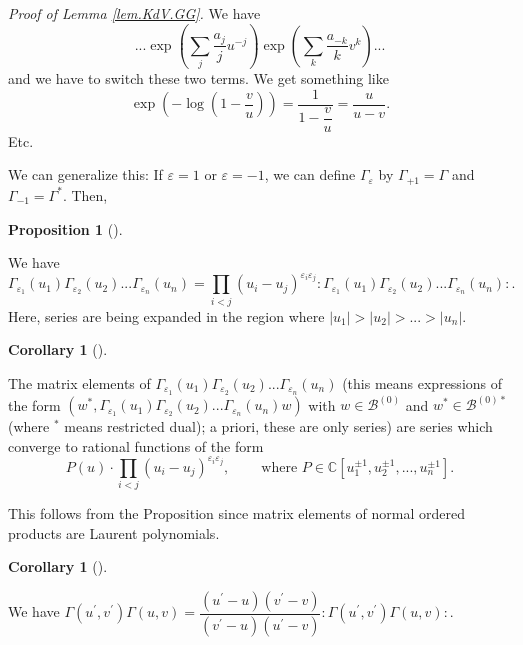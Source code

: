 \documentclass
[numbers=enddot,12pt,final,onecolumn,german,notitlepage]{scrartcl}%
\theoremstyle{definition}
\newtheorem{prop}[theo]{Proposition}
\newenvironment{proposition}[1][]
{\begin{prop}[#1]\begin{leftbar}}
{\end{leftbar}\end{prop}}
\newtheorem{coro}[theo]{Corollary}
\newenvironment{corollary}[1][]
{\begin{coro}[#1]\begin{leftbar}}
{\end{leftbar}\end{coro}}
\begin{document}
\textit{Proof of Lemma \ref{lem.KdV.GG}.} We have%
\[
...\exp\left(  \sum_{j}\dfrac{a_{j}}{j}u^{-j}\right)  \exp\left(  \sum
_{k}\dfrac{a_{-k}}{k}v^{k}\right)  ...
\]
and we have to switch these two terms. We get something like%
\[
\exp\left(  -\log\left(  1-\dfrac{v}{u}\right)  \right)  =\dfrac{1}%
{1-\dfrac{v}{u}}=\dfrac{u}{u-v}.
\]
Etc.

We can generalize this: If $\varepsilon=1$ or $\varepsilon=-1$, we can define
$\Gamma_{\varepsilon}$ by $\Gamma_{+1}=\Gamma$ and $\Gamma_{-1}=\Gamma^{\ast}%
$. Then,

\begin{proposition}
We have%
\[
\Gamma_{\varepsilon_{1}}\left(  u_{1}\right)  \Gamma_{\varepsilon_{2}}\left(
u_{2}\right)  ...\Gamma_{\varepsilon_{n}}\left(  u_{n}\right)  =\prod
\limits_{i<j}\left(  u_{i}-u_{j}\right)  ^{\varepsilon_{i}\varepsilon_{j}%
}\left.  :\Gamma_{\varepsilon_{1}}\left(  u_{1}\right)  \Gamma_{\varepsilon
_{2}}\left(  u_{2}\right)  ...\Gamma_{\varepsilon_{n}}\left(  u_{n}\right)
:\right.  .
\]
Here, series are being expanded in the region where $\left\vert u_{1}%
\right\vert >\left\vert u_{2}\right\vert >...>\left\vert u_{n}\right\vert $.
\end{proposition}

\begin{corollary}
The matrix elements of $\Gamma_{\varepsilon_{1}}\left(  u_{1}\right)
\Gamma_{\varepsilon_{2}}\left(  u_{2}\right)  ...\Gamma_{\varepsilon_{n}%
}\left(  u_{n}\right)  $ (this means expressions of the form $\left(  w^{\ast
},\Gamma_{\varepsilon_{1}}\left(  u_{1}\right)  \Gamma_{\varepsilon_{2}%
}\left(  u_{2}\right)  ...\Gamma_{\varepsilon_{n}}\left(  u_{n}\right)
w\right)  $ with $w\in\mathcal{B}^{\left(  0\right)  }$ and $w^{\ast}%
\in\mathcal{B}^{\left(  0\right)  \ast}$ (where $^{\ast}$ means restricted
dual); a priori, these are only series) are series which converge to rational
functions of the form%
\[
P\left(  u\right)  \cdot\prod\limits_{i<j}\left(  u_{i}-u_{j}\right)
^{\varepsilon_{i}\varepsilon_{j}},\ \ \ \ \ \ \ \ \ \ \text{where }%
P\in\mathbb{C}\left[  u_{1}^{\pm1},u_{2}^{\pm1},...,u_{n}^{\pm1}\right]  .
\]

\end{corollary}

This follows from the Proposition since matrix elements of normal ordered
products are Laurent polynomials.

\begin{corollary}
We have $\Gamma\left(  u^{\prime},v^{\prime}\right)  \Gamma\left(  u,v\right)
=\dfrac{\left(  u^{\prime}-u\right)  \left(  v^{\prime}-v\right)  }{\left(
v^{\prime}-u\right)  \left(  u^{\prime}-v\right)  }\left.  :\Gamma\left(
u^{\prime},v^{\prime}\right)  \Gamma\left(  u,v\right)  :\right.  $.
\end{corollary}
\end{document}

